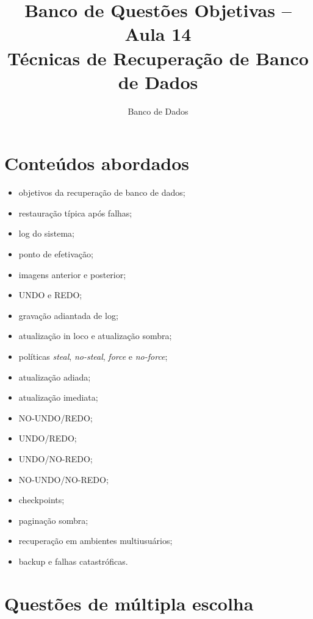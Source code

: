 \documentclass[12pt,a4paper]{article}
\title{Banco de Questões Objetivas -- Aula 14\\
Técnicas de Recuperação de Banco de Dados}
\author{Banco de Dados}
\date{}
\begin{document}
\maketitle

\section*{Conteúdos abordados}

\begin{itemize}
    \item objetivos da recuperação de banco de dados;
    \item restauração típica após falhas;
    \item log do sistema;
    \item ponto de efetivação;
    \item imagens anterior e posterior;
    \item UNDO e REDO;
    \item gravação adiantada de log;
    \item atualização in loco e atualização sombra;
    \item políticas \textit{steal}, \textit{no-steal}, \textit{force} e \textit{no-force};
    \item atualização adiada;
    \item atualização imediata;
    \item NO-UNDO/REDO;
    \item UNDO/REDO;
    \item UNDO/NO-REDO;
    \item NO-UNDO/NO-REDO;
    \item checkpoints;
    \item paginação sombra;
    \item recuperação em ambientes multiusuários;
    \item backup e falhas catastróficas.
\end{itemize}

\section{Questões de múltipla escolha}
\end{document}
